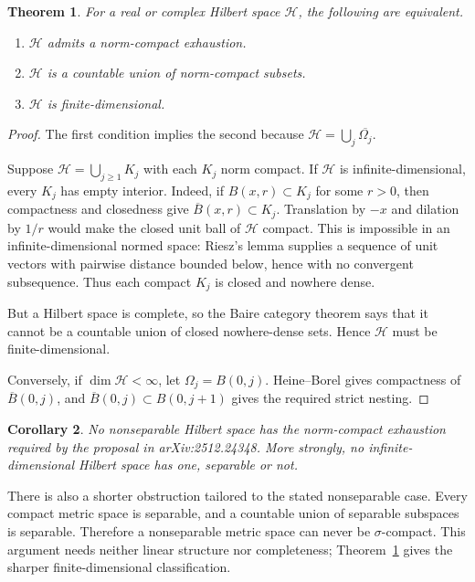 \documentclass[11pt]{article}
\newtheorem{theorem}{Theorem}
\newtheorem{corollary}[theorem]{Corollary}
\newcommand{\Hh}{\mathcal H}
\begin{document}
\begin{theorem}\label{thm:classification}
For a real or complex Hilbert space $\Hh$, the following are equivalent.
\begin{enumerate}
  \item $\Hh$ admits a norm-compact exhaustion.
  \item $\Hh$ is a countable union of norm-compact subsets.
  \item $\Hh$ is finite-dimensional.
\end{enumerate}
\end{theorem}

\begin{proof}
The first condition implies the second because
$\Hh=\bigcup_j\overline{\Omega_j}$.

Suppose $\Hh=\bigcup_{j\ge1}K_j$ with each $K_j$ norm compact.  If $\Hh$ is
infinite-dimensional, every $K_j$ has empty interior.  Indeed, if
$B(x,r)\subset K_j$ for some $r>0$, then compactness and closedness give
$\overline B(x,r)\subset K_j$.  Translation by $-x$ and dilation by $1/r$
would make the closed unit ball of $\Hh$ compact.  This is impossible in an
infinite-dimensional normed space: Riesz's lemma supplies a sequence of unit
vectors with pairwise distance bounded below, hence with no convergent
subsequence.  Thus each compact $K_j$ is closed and nowhere dense.

But a Hilbert space is complete, so the Baire category theorem says that it
cannot be a countable union of closed nowhere-dense sets.  Hence $\Hh$ must
be finite-dimensional.

Conversely, if $\dim\Hh<\infty$, let $\Omega_j=B(0,j)$.  Heine--Borel gives
compactness of $\overline B(0,j)$, and
$\overline B(0,j)\subset B(0,j+1)$ gives the required strict nesting.
\end{proof}

\begin{corollary}\label{cor:source}
No nonseparable Hilbert space has the norm-compact exhaustion required by the
proposal in arXiv:2512.24348.  More strongly, no infinite-dimensional Hilbert
space has one, separable or not.
\end{corollary}

There is also a shorter obstruction tailored to the stated nonseparable
case.  Every compact metric space is separable, and a countable union of
separable subspaces is separable.  Therefore a nonseparable metric space can
never be $\sigma$-compact.  This argument needs neither linear structure nor
completeness; Theorem~\ref{thm:classification} gives the sharper
finite-dimensional classification.
\end{document}
